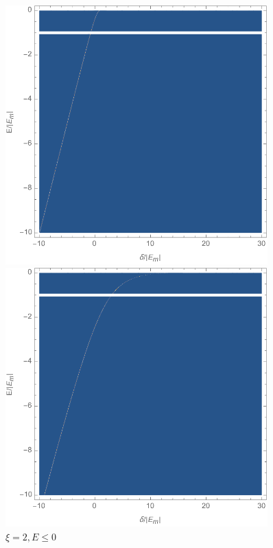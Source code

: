 \documentclass{article}
\theoremstyle{definition}
\begin{document}
\begin{enumerate}[label=(\alph*)]
\begin{figure}[!htb]
\centering
\begin{minipage}{0.3\textwidth}
\includegraphics[width=0.9\textwidth]{UmE_density_plot_neg.png}
\caption{$\xi = 2, E \leq 0$}
\end{minipage}
\begin{minipage}{0.3\textwidth}
\includegraphics[width=0.9\textwidth]{UmE_density_plot_8_neg.png}

\end{minipage}
\end{figure}
\end{enumerate}
\end{document}

